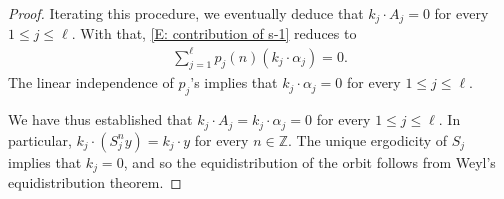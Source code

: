 \documentclass[10pt,a4paper]{amsart}
\newcommand{\Z}{{\mathbb Z}}
\begin{document}
\begin{proof}
    Iterating this procedure, we eventually deduce that $k_j\cdot A_j = 0$ for every $1\leq j\leq \ell$. With that, \eqref{E: contribution of s-1} reduces to
    \begin{align*}
        \sum_{j=1}^\ell p_j(n)(k_j\cdot\alpha_j) = 0.
    \end{align*}
    The linear independence of $p_j$'s implies that $k_j\cdot \alpha_j = 0$ for every $1\leq j\leq \ell$.

    We have thus established that $k_j \cdot A_j = k_j \cdot \alpha_j = 0$ for every $1\leq j\leq \ell$. In particular, $k_j\cdot (S_j^n y) = k_j\cdot y$ for every $n\in\Z$. The unique ergodicity of $S_j$ implies that $k_j = 0$, and so the equidistribution of the orbit follows from Weyl's equidistribution theorem. 
 \end{proof}
\end{document}
